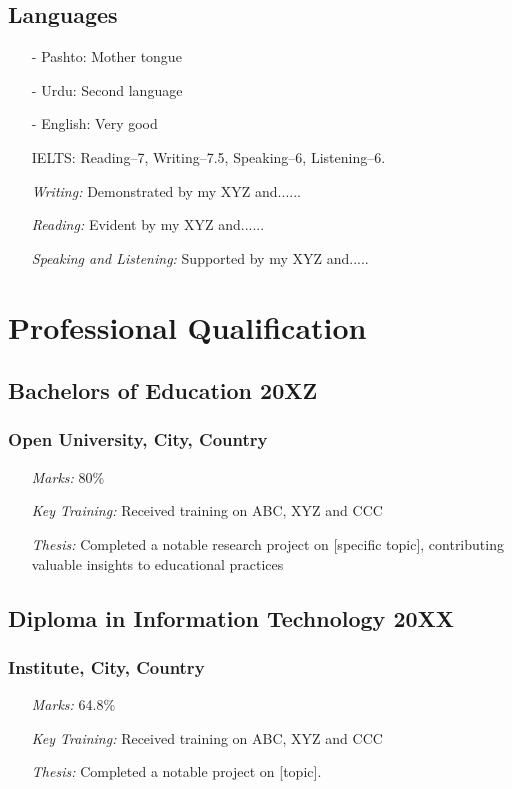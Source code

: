 \documentclass[11pt]{article}
\begin{document}
\subsection{Languages}
\begin{itemize}
    \item[-] \textcolor{Sepia}{Pashto}: Mother tongue
    \item[-] \textcolor{Sepia}{Urdu}: Second language
    \item[-] \textcolor{Sepia}{English}: Very good
        \item[\checkmark] IELTS: Reading--7, Writing--7.5, Speaking--6, Listening--6.
        \item[\checkmark] \textit{Writing:}  Demonstrated by my XYZ and......
        \item[\checkmark] \textit{Reading:}  Evident by my XYZ and......
        \item[\checkmark] \textit{Speaking and Listening:} Supported by my XYZ and.....
    \end{itemize}

\section{Professional Qualification}
\subsection{Bachelors of Education \hfill \normalfont 20XZ}
\subsubsection{Open University,  City, Country }
\begin{itemize}
    \item[\checkmark] \textit{Marks:} 80\% %
    \item[\checkmark] \textit{Key Training:} Received training on ABC, XYZ and CCC
    \item[\checkmark] \textit{Thesis:} Completed a notable research project on [specific topic], contributing valuable insights to educational practices
\end{itemize}

\subsection{Diploma in Information Technology \hfill \normalfont 20XX}
\subsubsection{Institute,  City, Country }
\begin{itemize}
    \item[\checkmark] \textit{Marks:} 64.8\% %
    \item[\checkmark] \textit{Key Training:} Received training on ABC, XYZ and CCC
    \item[\checkmark] \textit{Thesis:} Completed a notable project on [topic].
\end{itemize}
\end{document}
